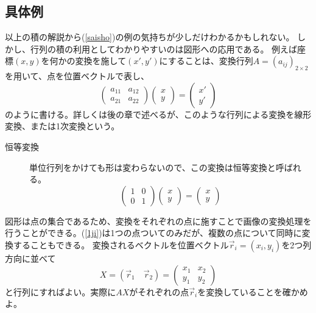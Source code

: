 \documentclass[10pt]{jsarticle}
\theoremstyle{definition}%
\newcommand{\kakko}[1]{\left(#1 \right)} %
\newcommand{\vc}[1]{\overrightarrow{#1}}%
\numberwithin{equation}{section}%
\begin{document}
\subsection{具体例}
以上の積の解説から(\ref{saisho})の例の気持ちが少しだけわかるかもしれない。
しかし、行列の積の利用としてわかりやすいのは図形への応用である。
例えば座標$(x,y)$を何かの変換を施して$(x',y')$にすることは、変換行列$A=(a_{ij})_{2\times 2}$を用いて、点を位置ベクトルで表し、
\begin{equation}
 \label{1ji} \kakko{\begin{matrix}
 a_{11} & a_{12}  \\
 a_{21} & a_{22}
  \end{matrix}}
  \kakko{\begin{matrix}
 x  \\
 y
  \end{matrix}}=
  \kakko{\begin{matrix}
 x'  \\
 y'
  \end{matrix}}
\end{equation}
のように書ける。詳しくは後の章で述べるが、このような行列による変換を線形変換、または1次変換という。
\begin{framed}
  \begin{description}
    \item[恒等変換] 
    単位行列をかけても形は変わらないので、この変換は恒等変換と呼ばれる。
    \begin{equation}
      \kakko{\begin{matrix}
      1 & 0  \\
      0 & 1
      \end{matrix}}
      \kakko{\begin{matrix}
     x  \\
     y
      \end{matrix}}=
      \kakko{\begin{matrix}
     x  \\
     y
      \end{matrix}}
    \end{equation}
  \end{description}
\end{framed}
図形は点の集合であるため、変換をそれぞれの点に施すことで画像の変換処理を行うことができる。(\ref{1ji})は1つの点ついてのみだが、複数の点について同時に変換することもできる。
変換されるベクトルを位置ベクトル$\vc{r}_{i}=(x_{i},y_{i})$を2つ列方向に並べて
\begin{equation}
  X=(\vc{r}_{1}\quad \vc{r}_{2})=
  \kakko{
    \begin{matrix}
      x_{1} & x_{2}\\
      y_{1} & y_{2}
    \end{matrix}
  }
\end{equation}
と行列にすればよい。実際に$AX$がそれぞれの点$\vc{r}_{i}$を変換していることを確かめよ。
\end{document}
